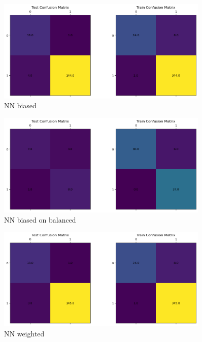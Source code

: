 \documentclass[12pt]{article}
\begin{document}
        \newpage


        \begin{figure}[h!]
            \centering
            \includegraphics[width=0.9\textwidth]{resources/conf_nn_biased.png}
            \caption{NN biased}
            \label{fig:conf_nn_biased}
        \end{figure}


        \begin{figure}[h!]
            \centering
            \includegraphics[width=0.9\textwidth]{resources/conf_nn_biased_balanced.png}
            \caption{NN biased on balanced}
            \label{fig:conf_nn_biased_on_balanced}
        \end{figure}

        \newpage


        \begin{figure}[h!]
            \centering
            \includegraphics[width=0.9\textwidth]{resources/conf_nn_weighted.png}
            \caption{NN weighted}
            \label{fig:conf_nn_weighted}
        \end{figure}
\end{document}
